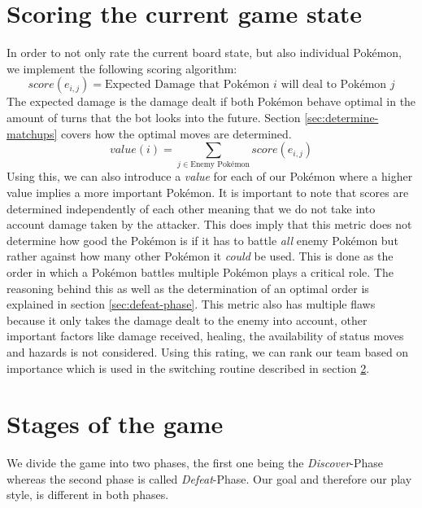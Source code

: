 \section{Scoring the current game state}
\label{sec:scoring-state}
In order to not only rate the current board state, but also individual Pokémon, we implement the following scoring 
algorithm:
\begin{equation}
\label{eq:score-attack}
	score(e_{i, j}) = \text{Expected Damage that Pokémon } i \text{ will deal to Pokémon }j
\end{equation}
The expected damage is the damage dealt if both Pokémon behave optimal in the amount of turns that the bot looks into
the future. Section \ref{sec:determine-matchups} covers how the optimal moves are determined.
\begin{equation}
	value(i) = \sum_{j \in \text{Enemy Pokémon}} score(e_{i, j})
\end{equation}
Using this, we can also introduce a \textit{value} for each of our Pokémon where a higher value implies a more important
Pokémon. It is important to note that scores are determined independently of each other meaning that we do not take
into account damage taken by the attacker. This does imply that this metric does not determine how good the 
Pokémon is if it has to battle \textit{all} enemy Pokémon but rather against how many other Pokémon it \textit{could}
be used. This is done as the order in which a Pokémon battles multiple Pokémon plays a critical role. The reasoning
behind this as well as the determination of an optimal order is explained in section \ref{sec:defeat-phase}.
This metric also has multiple flaws because it only takes the damage dealt to the enemy into account, other important 
factors like damage received, healing, the availability of status moves and hazards is not considered. Using 
this rating, we can rank our team based on importance which is used in the switching routine described in 
section \ref{sec:stages-of-game}.

\section{Stages of the game}
\label{sec:stages-of-game}
We divide the game into two phases, the first one being the \textit{Discover}-Phase whereas the second phase is called
\textit{Defeat}-Phase. Our goal and therefore our play style, is different in both phases.
